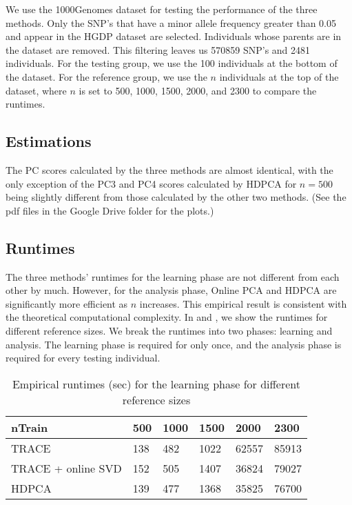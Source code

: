 \documentclass{article}[12pt]
\begin{document}
We use the 1000Genomes dataset for testing the performance of the three methods.
Only the SNP's that have a minor allele frequency greater than 0.05 and appear in the HGDP dataset are selected.
Individuals whose parents are in the dataset are removed.
This filtering leaves us 570859 SNP's and 2481 individuals.
For the testing group, we use the 100 individuals at the bottom of the dataset.
For the reference group, we use the $n$ individuals at the top of the dataset,
where $n$ is set to 500, 1000, 1500, 2000, and 2300 to compare the runtimes.



\subsection{Estimations}

The PC scores calculated by the three methods are almost identical,
with the only exception of the PC3 and PC4 scores calculated by HDPCA for $n = 500$ being slightly different from those calculated by the other two methods.
(See the pdf files in the Google Drive folder for the plots.)


\subsection{Runtimes}

The three methods' runtimes for the learning phase are not different from each other by much.
However, for the analysis phase, Online PCA and HDPCA are significantly more efficient as $n$ increases.
This empirical result is consistent with the theoretical computational complexity.
In  and ,
we show the runtimes for different reference sizes.
We break the runtimes into two phases: learning and analysis.
The learning phase is required for only once,
and the analysis phase is required for every testing individual.


\begin{table} 
  \centering
  \begin{tabular}{|l|l|l|l|l|l|}
    \hline
    nTrain & 500 & 1000 & 1500 & 2000 & 2300 \\ 
    \hline
    TRACE & 138 & 482 & 1022 & 62557 & 85913 \\
    \hline
    TRACE + online SVD & 152 & 505 & 1407 & 36824 & 79027 \\
    \hline
    HDPCA & 139 & 477 & 1368 & 35825 & 76700 \\
    \hline
  \end{tabular}
  \caption{Empirical runtimes (sec) for the learning phase for different reference sizes}
  \label{tbl:runLearn}
\end{table}
\end{document}
